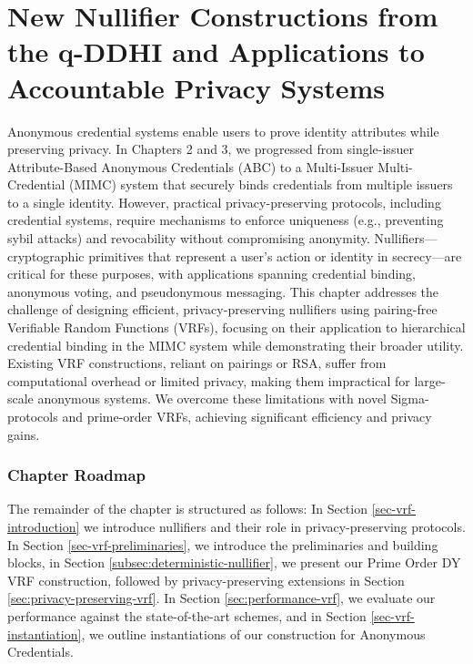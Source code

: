 \chapter{New Nullifier Constructions from the q-DDHI and Applications to Accountable Privacy Systems }\label{chap4}
Anonymous credential systems enable users to prove identity attributes while preserving privacy. In Chapters 2 and 3, we progressed from single-issuer Attribute-Based Anonymous Credentials (ABC) to a Multi-Issuer Multi-Credential (MIMC) system that securely binds credentials from multiple issuers to a single identity. However, practical privacy-preserving protocols, including credential systems, require mechanisms to enforce uniqueness (e.g., preventing sybil attacks) and revocability without compromising anonymity. Nullifiers—cryptographic primitives that represent a user’s action or identity in secrecy—are critical for these purposes, with applications spanning credential binding, anonymous voting, and pseudonymous messaging. This chapter addresses the challenge of designing efficient, privacy-preserving nullifiers using pairing-free Verifiable Random Functions (VRFs), focusing on their application to hierarchical credential binding in the MIMC system while demonstrating their broader utility. Existing VRF constructions, reliant on pairings or RSA, suffer from computational overhead or limited privacy, making them impractical for large-scale anonymous systems. We overcome these limitations with novel Sigma-protocols and prime-order VRFs, achieving significant efficiency and privacy gains.

\subsection*{Chapter Roadmap}
The remainder of the chapter is structured as follows: In Section \ref{sec-vrf-introduction} we introduce nullifiers and their role in privacy-preserving protocols. In Section \ref{sec-vrf-preliminaries}, we introduce the preliminaries and building blocks, in Section \ref{subsec:deterministic-nullifier}, we present our Prime Order DY VRF construction, followed by privacy-preserving extensions in Section \ref{sec:privacy-preserving-vrf}. In Section \ref{sec:performance-vrf}, we evaluate our performance against the state-of-the-art schemes, and in Section \ref{sec-vrf-instantiation}, we outline instantiations of our construction for Anonymous Credentials. 

